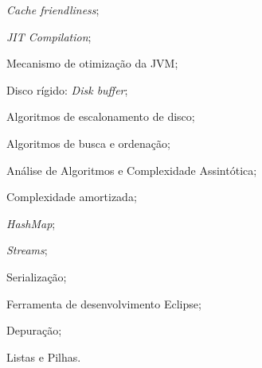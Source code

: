 \documentclass{article}
\begin{document}
\begin{itemize*}[label={}]
    \item \textit{Cache friendliness};
    \item \textit{JIT Compilation};
    \item Mecanismo de otimização da JVM\@;
    \item Disco rígido: \textit{Disk buffer};
    \item Algoritmos de escalonamento de disco;

    \item Algoritmos de busca e ordenação;
    \item Análise de Algoritmos e Complexidade Assintótica;
    \item Complexidade amortizada;

    \item \textit{HashMap};
    \item \textit{Streams};
    \item Serialização;

    \item Ferramenta de desenvolvimento Eclipse;
    \item Depuração;

    \item Listas e Pilhas.
\end{itemize*}
\end{document}
